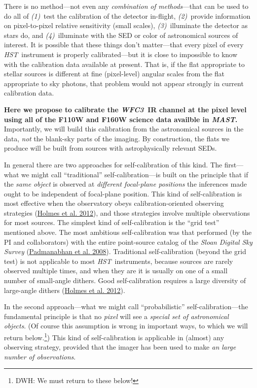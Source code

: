 \documentclass[12pt]{article}
\newcommand{\project}[1]{\textsl{#1}}
\newcommand{\HST}{\project{HST}}
\newcommand{\WFC}{\project{WFC3}}
\newcommand{\MAST}{\project{MAST}}
\begin{document}
There is no method---not even any \emph{combination of methods}---that
can be used to do all of \textsl{(1)}~test the calibration of the
detector in-flight, \textsl{(2)}~provide information on pixel-to-pixel
relative sensitivity (small scales), \textsl{(3)}~illuminate the
detector as stars do, and \textsl{(4)}~illuminate with the SED or
color of astronomical sources of interest.  It is possible that these
things don't matter---that every pixel of every \HST\ instrument is
properly calibrated---but it is close to impossible to know with the
calibration data available at present.  That is, if the flat
appropriate to stellar sources is different at fine (pixel-level)
angular scales from the flat appropriate to sky photons, that problem
would not appear strongly in current calibration data.

\textbf{Here we propose to calibrate the \WFC\ IR channel at the pixel
  level using all of the F110W and F160W science data availble in \MAST.}
Importantly, we will build this calibration from the astronomical
sources in the data, \emph{not} the blank-sky parts of the imaging.
By construction, the flats we produce will be built from sources with
astrophysically relevant SEDs.

In general there are two approaches for self-calibration of this kind.
The first---what we might call ``traditional'' self-calibration---is
built on the principle that if the \emph{same object} is observed at
\emph{different focal-plane positions} the inferences made ought to be
independent of focal-plane position.  This kind of self-calibration is
most effective when the observatory obeys calibration-oriented
observing strategies (\href{http://bit.ly/15TAoYy}{Holmes et
  al. 2012}), and those strategies involve
multiple observations for most sources.  The simplest kind of
self-calibration is the ``grid test'' mentioned above.  The most
ambitious self-calibration was that performed (by the PI and
collaborators) with the entire point-source catalog of the
\project{Sloan Digital Sky Survey}
(\href{http://bit.ly/12dPkSh}{Padmanabhan et al. 2008}).  Traditional
self-calibration (beyond the grid test) is not applicable to most
\HST\ instruments, because sources are rarely observed multiple times,
and when they are it is usually on one of a small number of
small-angle dithers.  Good self-calibration requires a large diversity
of large-angle dithers (\href{http://bit.ly/15TAoYy}{Holmes et al. 2012}).

In the second approach---what we might call ``probabilistic''
self-calibration---the fundamental principle is that no \emph{pixel}
will see a \emph{special set of astronomical objects}.  (Of course
this assumption is wrong in important ways, to which we will return
below.\footnote{\color{red} DWH: We must return to these below!})  This kind of
self-calibration is applicable in (almost) any observing strategy,
provided that the imager has been used to make \emph{an large
  number of observations}.
\end{document}
